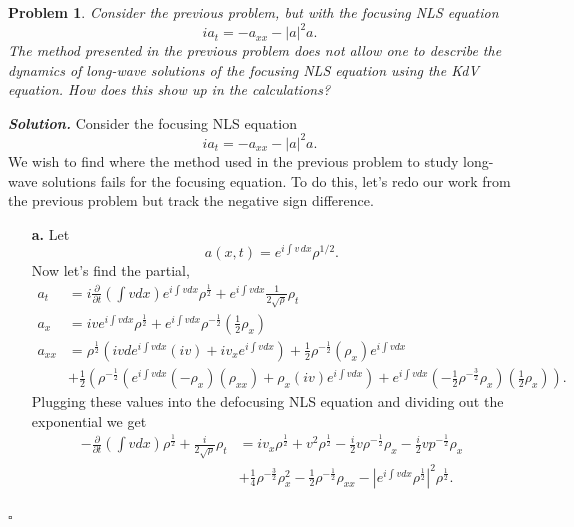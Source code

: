 \documentclass[12pt]{report}
\newtheorem{problem}{Problem}
\newenvironment{solution}[1][\it{Solution}]{\textbf{#1. } }{$\square$}
\newcommand{\paren}[1]{{\left(#1\right)}} %
\newcommand{\abs}[1]{{\left|#1\right|}} %
\newcommand{\pp}[2]{\frac{\partial #1}{\partial #2}} %
\begin{document}


\begin{problem}
    Consider the previous problem, but with the focusing NLS equation
\[
i a_t=-a_{xx}-|a|^2 a.
\]
The method presented in the previous problem does not allow one to describe the dynamics of long-wave solutions of the focusing NLS equation using the KdV equation. How does this show up in the calculations?

\end{problem}

\begin{solution}
    \noindent
    Consider the focusing NLS equation
    \[
    i a_t=-a_{xx}-|a|^2 a.
    \]
    We wish to find where the method used in the previous problem to study long-wave solutions fails for the focusing equation. To do this, let's redo our work from the previous problem but track the negative sign difference.
    \begin{enumerate}
        \item[{\bf a.}]
        Let 
        \[
            a(x,t)=e^{i \int v \,dx} \rho^{1/2}. 
        \]
        Now let's find the partial,
        \begin{align*}
            a_t &= i \pp{}{t}\paren{\int v dx}e^{i \int v dx}\rho^{\frac{1}{2}} + e^{i\int v dx}\frac{1}{2\sqrt{\rho}}\rho_t\\
            a_{x} &= ive^{i\int v dx}\rho^{\frac{1}{2}} + e^{i\int v dx}\rho^{-\frac{1}{2}}\paren{\frac{1}{2}\rho_x}\\
            a_{xx} &= \rho^{\frac{1}{2}}\paren{ivde^{i\int v dx}(iv) + iv_xe^{i \int v dx}} + \frac{1}{2}\rho^{-\frac{1}{2}}(\rho_x)e^{i \int v dx}\\ 
            &+ \frac{1}{2}\paren{\rho^{-\frac{1}{2}}\paren{e^{i\int v dx}(-\rho_x)(\rho_{xx}) + \rho_x(iv)e^{i \int v dx}} + e^{i \int v dx}(-\frac{1}{2}\rho^{-\frac{3}{2}}\rho_x)(\frac{1}{2}\rho_x)}.
        \end{align*}
        Plugging these values into the defocusing NLS equation and dividing out the exponential we get
        \begin{align*}
            -\pp{}{t}\paren{\int v dx}\rho^{\frac{1}{2}} + \frac{i}{2\sqrt{\rho}}\rho_t &= iv_x\rho^{\frac{1}{2}} + v^2\rho^\frac{1}{2} - \frac{i}{2}v\rho^{-\frac{1}{2}}\rho_x - \frac{i}{2}vp^{-\frac{1}{2}}\rho_x\\ 
            &+ \frac{1}{4}\rho^{-\frac{3}{2}}\rho_x^2 - \frac{1}{2}\rho^{-\frac{1}{2}}\rho_{xx} - \abs{e^{i \int v dx}\rho^\frac{1}{2}}^2 \rho^{\frac{1}{2}}.

\end{align*}
\end{enumerate}
\end{solution}
\end{document}
